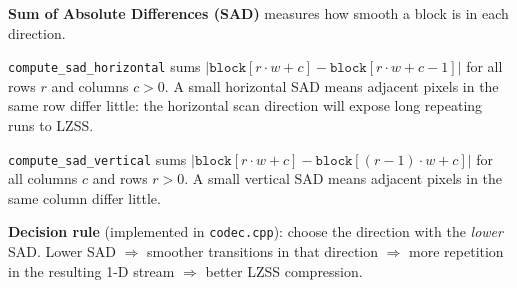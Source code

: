 \textbf{Sum of Absolute Differences (SAD)} measures how smooth a block is in each direction.

\texttt{compute\_sad\_horizontal} sums $|\mathtt{block}[r \cdot w + c] - \mathtt{block}[r \cdot w + c-1]|$
for all rows $r$ and columns $c > 0$.
A small horizontal SAD means adjacent pixels in the same row differ little:
the horizontal scan direction will expose long repeating runs to LZSS.

\texttt{compute\_sad\_vertical} sums $|\mathtt{block}[r \cdot w + c] - \mathtt{block}[(r-1) \cdot w + c]|$
for all columns $c$ and rows $r > 0$.
A small vertical SAD means adjacent pixels in the same column differ little.

\textbf{Decision rule} (implemented in \texttt{codec.cpp}):
choose the direction with the \emph{lower} SAD.
Lower SAD $\Rightarrow$ smoother transitions in that direction $\Rightarrow$
more repetition in the resulting 1-D stream $\Rightarrow$ better LZSS compression.
